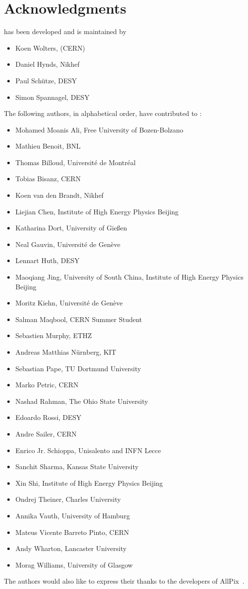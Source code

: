\chapter{Acknowledgments}

\apsq has been developed and is maintained by

\begin{itemize}
\item Koen Wolters, (CERN)
\item Daniel Hynds, Nikhef
\item Paul Schütze, DESY
\item Simon Spannagel, DESY
\end{itemize}

The following authors, in alphabetical order, have contributed to \apsq:

\begin{itemize}
\item Mohamed Moanis Ali, Free University of Bozen-Bolzano
\item Mathieu Benoit, BNL
\item Thomas Billoud, Université de Montréal
\item Tobias Bisanz, CERN
\item Koen van den Brandt, Nikhef
\item Liejian Chen, Institute of High Energy Physics Beijing
\item Katharina Dort, University of Gie\ss en
\item Neal Gauvin, Université de Genève
\item Lennart Huth, DESY
\item Maoqiang Jing, University of South China, Institute of High Energy Physics Beijing
\item Moritz Kiehn, Université de Genève
\item Salman Maqbool, CERN Summer Student
\item Sebastien Murphy, ETHZ
\item Andreas Matthias Nürnberg, KIT
\item Sebastian Pape, TU Dortmund University
\item Marko Petric, CERN
\item Nashad Rahman, The Ohio State University
\item Edoardo Rossi, DESY
\item Andre Sailer, CERN
\item Enrico Jr. Schioppa, Unisalento and INFN Lecce
\item Sanchit Sharma, Kansas State University
\item Xin Shi, Institute of High Energy Physics Beijing
\item Ondrej Theiner, Charles University
\item Annika Vauth, University of Hamburg
\item Mateus Vicente Barreto Pinto, CERN
\item Andy Wharton, Lancaster University
\item Morag Williams, University of Glasgow
\end{itemize}

The authors would also like to express their thanks to the developers of AllPix~\cite{ap1wiki,ap1git}.
